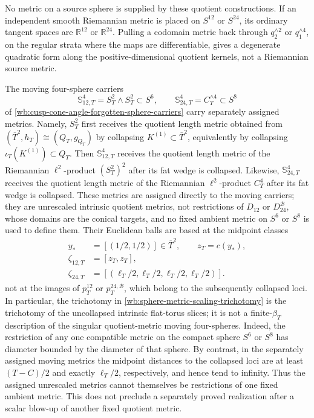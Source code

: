 No metric on a source sphere is supplied by these quotient constructions.
If an independent smooth Riemannian metric is placed on \(S^{12}\) or
\(S^{24}\), its ordinary tangent spaces are \(\mathbb R^{12}\) or
\(\mathbb R^{24}\).  Pulling a codomain metric back through
\(q_2^{\wedge2}\) or \(q_1^{\wedge4}\), on the regular strata where the
maps are differentiable, gives a degenerate quadratic form along the
positive-dimensional quotient kernels, not a Riemannian source metric.

The moving four-sphere carriers
\[
 \mathbb S_{12,T}^4=S_T^2\wedge S_T^2\subset S^6,\qquad
 \mathbb S_{24,T}^4=C_T^{\wedge4}\subset S^8
\]
of \cref{wb:cusp-cone-angle-forgotten-sphere-carriers} carry separately
assigned metrics.  Namely, \(S_T^2\) first receives the quotient length
metric obtained from
\((\overline T^2,h_T)\cong(Q_T,g_{Q_T})\) by collapsing
\(K^{(1)}\subset\overline T^2\), equivalently by collapsing
\(\iota_T(K^{(1)})\subset Q_T\).  Then
\(\mathbb S_{12,T}^4\) receives the quotient length metric of the
Riemannian \(\ell^2\)-product \((S_T^2)^2\) after its fat wedge is
collapsed.  Likewise, \(\mathbb S_{24,T}^4\) receives the quotient length
metric of the Riemannian \(\ell^2\)-product \(C_T^4\) after its fat wedge is
collapsed.  These metrics are assigned directly to the moving carriers;
they are unrescaled intrinsic quotient metrics, not restrictions of
\(D_{12}\) or \(D_{24}^{\mathcal B}\), whose domains are the conical
targets, and no fixed ambient metric on \(S^6\) or \(S^8\) is used to
define them.  Their Euclidean balls are
based at the midpoint classes
\[
 \begin{aligned}
  y_*&=[(1/2,1/2)]\in\overline T^2,\qquad z_T=c(y_*),\\
  \zeta_{12,T}&=[z_T,z_T],\\
  \zeta_{24,T}
  &=[(\ell_T/2,\ell_T/2,\ell_T/2,\ell_T/2)].
 \end{aligned}
\]
not at the images of \(p_T^{12}\) or \(p_T^{24,\mathcal B}\), which belong
to the subsequently collapsed loci.  In particular, the trichotomy in
\cref{wb:sphere-metric-scaling-trichotomy} is the trichotomy of the
uncollapsed intrinsic flat-torus slices; it is not a finite-\(\beta_T\)
description of the singular quotient-metric moving four-spheres.  Indeed,
the restriction of any one compatible metric on the compact sphere
\(S^6\) or \(S^8\) has diameter bounded by the diameter of that sphere.  By
contrast, in the separately assigned moving metrics the midpoint distances
to the collapsed loci are at least \((T-C)/2\) and exactly
\(\ell_T/2\), respectively, and hence tend to infinity.  Thus the assigned
unrescaled metrics cannot themselves be restrictions of one fixed ambient
metric.  This does not preclude a separately proved realization after a
scalar blow-up of another fixed quotient metric.

